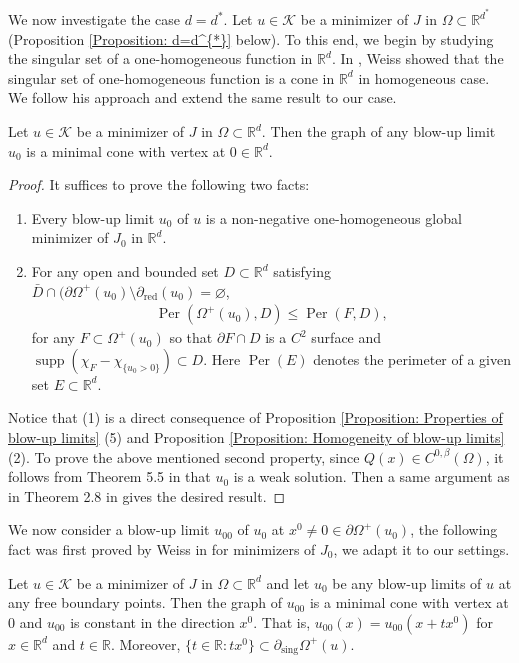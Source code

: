\documentclass[11pt,reqno]{amsart}
\begin{document}
We now investigate the case $d=d^{*}$. Let $u\in\mathcal{K}$ be a minimizer of $J$ in $\Omega\subset\mathbb{R}^{d^{*}}$ (Proposition \ref{Proposition: d=d^{*}} below). To this end, we begin by studying the singular set of a one-homogeneous function in $\mathbb{R}^{d}$. In \cite{W1999}, Weiss showed that the singular set of one-homogeneous function is a cone in $\mathbb{R}^{d}$ in homogeneous case. We follow his approach and extend the same result to our case.
\begin{lemma}
	Let $u\in\mathcal{K}$ be a minimizer of $J$ in $\Omega\subset\mathbb{R}^{d}$. Then the graph of any blow-up limit $u_{0}$ is a minimal cone with vertex at $0\in\mathbb{R}^{d}$.
\end{lemma}
\begin{proof}
	It suffices to prove the following two facts:
	\begin{enumerate}
		\item Every blow-up limit $u_{0}$ of $u$ is a non-negative one-homogeneous global minimizer of $J_{0}$ in $\mathbb{R}^{d}$.
		\item For any open and bounded set $D\subset\mathbb{R}^{d}$ satisfying $\bar{D}\cap(\partial\varOmega^{+}(u_{0})\setminus\partial_{\mathrm{red}}(u_{0})=\varnothing$,
		\begin{align*}
			\operatorname{Per}(\varOmega^{+}(u_{0}),D)\leqslant\operatorname{Per}(F,D),
		\end{align*}
		for any $F\subset\varOmega^{+}(u_{0})$ so that $\partial F\cap D$ is a $C^{2}$ surface and $\operatorname{supp}(\chi_{F}-\chi_{\{u_{0}>0\}})\subset D$. Here $\operatorname{Per}(E)$ denotes the perimeter of a given set $E\subset\mathbb{R}^{d}$.
	\end{enumerate}
	Notice that (1) is a direct consequence of Proposition \ref{Proposition: Properties of blow-up limits} (5) and Proposition \ref{Proposition: Homogeneity of blow-up limits} (2). To prove the above mentioned second property, since $Q(x)\in C^{0,\beta}(\Omega)$, it follows from Theorem 5.5 in \cite{AC1981} that $u_{0}$ is a weak solution. Then a same argument as in Theorem 2.8 in \cite{W1999} gives the desired result.
\end{proof}
We now consider a blow-up limit $u_{00}$ of $u_{0}$ at $x^{0}\neq0\in\partial\varOmega^{+}(u_{0})$, the following fact was first proved by Weiss in \cite{W1999} for minimizers of $J_{0}$, we adapt it to our settings.
\begin{lemma}\label{Lemma: Graph of u_{00}}
	Let $u\in\mathcal{K}$ be a minimizer of $J$ in $\Omega\subset\mathbb{R}^{d}$ and let $u_{0}$ be any blow-up limits of $u$ at any free boundary points. Then the graph of $u_{00}$ is a minimal cone with vertex at $0$ and $u_{00}$ is constant in the direction $x^{0}$. That is, $u_{00}(x)=u_{00}(x+tx^{0})$ for $x\in\mathbb{R}^{d}$ and $t\in\mathbb{R}$. Moreover,  $\{t\in\mathbb{R}\colon tx^{0}\}\subset\partial_{\mathrm{sing}}\varOmega^{+}(u)$.
\end{lemma}
\end{document}
